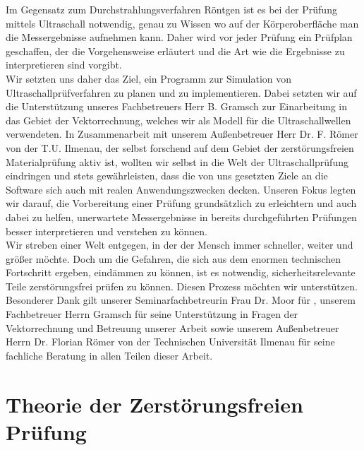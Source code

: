 \documentclass[reducespace,stylepage,semiarbeit]{spezidoc}
\begin{document}
Im Gegensatz zum Durchstrahlungsverfahren Röntgen ist es bei der Prüfung mittels Ultraschall notwendig, genau zu Wissen wo auf der Körperoberfläche man die Messergebnisse aufnehmen kann. Daher wird vor jeder Prüfung ein Prüfplan geschaffen, der die Vorgehensweise erläutert und die Art wie die Ergebnisse zu interpretieren sind vorgibt.\\
Wir setzten uns daher das Ziel, ein Programm zur Simulation von Ultraschallprüfverfahren zu planen und zu implementieren. Dabei setzten wir auf die Unterstützung unseres Fachbetreuers Herr B. Gramsch zur Einarbeitung in das Gebiet der Vektorrechnung, welches wir als Modell für die Ultraschallwellen verwendeten. In Zusammenarbeit mit unserem Außenbetreuer Herr Dr. F. Römer von der T.U. Ilmenau, der selbst forschend auf dem Gebiet der zerstörungsfreien Materialprüfung aktiv ist, wollten wir selbst in die Welt der Ultraschallprüfung eindringen und stets gewährleisten, dass die von uns gesetzten Ziele an die Software sich auch mit realen Anwendungszwecken decken.
Unseren Fokus legten wir darauf, die Vorbereitung einer Prüfung grundsätzlich zu erleichtern und auch dabei zu helfen, unerwartete Messergebnisse in bereits durchgeführten Prüfungen besser interpretieren und verstehen zu können.\\
Wir streben einer Welt entgegen, in der der Mensch immer schneller, weiter und größer möchte. Doch um die Gefahren, die sich aus dem enormen technischen Fortschritt ergeben, eindämmen zu können, ist es notwendig, sicherheitsrelevante Teile zerstörungsfrei prüfen zu können. Diesen Prozess möchten wir unterstützen.\\
Besonderer Dank gilt unserer Seminarfachbetreurin Frau Dr. Moor für 
, unserem Fachbetreuer Herrn Gramsch für seine Unterstützung in Fragen der Vektorrechnung und Betreuung unserer Arbeit sowie unserem Außenbetreuer Herrn Dr. Florian Römer von der Technischen Universität Ilmenau für seine fachliche Beratung in allen Teilen dieser Arbeit.

\newpage

\section{Theorie der Zerstörungsfreien Prüfung}
\end{document}
